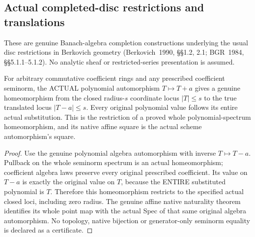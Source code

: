 \subsection{Actual completed-disc restrictions and translations}
\label{subsec:gauss-disc-restrictions}

These are genuine Banach-algebra completion constructions underlying
the usual disc restrictions in Berkovich geometry (Berkovich~1990,
\S\S1.2, 2.1; BGR~1984, \S\S5.1.1--5.1.2).
No analytic sheaf or restricted-series presentation is assumed.

\begin{theorem}
\label{spectrum:actual-translated-closed-disc}
\leanok
For arbitrary commutative coefficient rings and any prescribed
coefficient seminorm, the ACTUAL polynomial automorphism
$T\mapsto T+a$ gives a genuine homeomorphism from the closed
radius-$s$ coordinate locus $|T|\leq s$ to the true translated
locus $|T-a|\leq s$. Every original polynomial value follows
its entire actual substitution. This is the restriction of a
proved whole polynomial-spectrum homeomorphism, and its native
affine square is the actual scheme automorphism's square.
\end{theorem}
\begin{proof}
Use the genuine polynomial algebra automorphism with inverse
$T\mapsto T-a$. Pullback on the whole seminorm spectrum is an
actual homeomorphism; coefficient algebra laws preserve every
original prescribed coefficient. Its value on $T-a$ is exactly
the original value on $T$, because the ENTIRE substituted
polynomial is $T$. Therefore this homeomorphism restricts to the
specified actual closed loci, including zero radius. The genuine
affine native naturality theorem identifies its whole point map
with the actual Spec of that same original algebra automorphism.
No topology, native bijection or generator-only seminorm equality
is declared as a certificate.
\end{proof}

